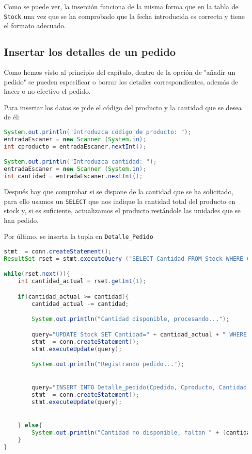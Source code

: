 Como se puede ver, la inserción funciona de la misma forma que en la tabla de \texttt{Stock} una vez que se ha comprobado que la fecha introducida es correcta y tiene el formato adecuado.

\pagebreak
\subsection{Insertar los detalles de un pedido}
Como hemos visto al principio del capítulo, dentro de la opción de "añadir un pedido" se pueden especificar o borrar los detalles correspondientes, además de hacer o no efectivo el pedido.

Para insertar los datos se pide el código del producto y la cantidad que se desea de él:

\begin{lstlisting}[language=Java]
System.out.println("Introduzca código de producto: ");
entradaEscaner = new Scanner (System.in);
int cproducto = entradaEscaner.nextInt();

System.out.println("Introduzca cantidad: ");
entradaEscaner = new Scanner (System.in);
int cantidad = entradaEscaner.nextInt();

\end{lstlisting}

Después hay que comprobar si se dispone de la cantidad que se ha solicitado, para ello usamos un \texttt{SELECT} que nos indique la cantidad total del producto en stock y, si es suficiente, actualizamos el producto restándole las unidades que se han pedido.

Por último, se inserta la tupla en \texttt{Detalle\_Pedido}

\begin{lstlisting}[language=Java]
stmt  = conn.createStatement();
ResultSet rset = stmt.executeQuery ("SELECT Cantidad FROM Stock WHERE Cproducto='" + cproducto + "'");

while(rset.next()){
	int cantidad_actual = rset.getInt(1);

	if(cantidad_actual >= cantidad){
		cantidad_actual -= cantidad;

		System.out.println("Cantidad disponible, procesando...");

		query="UPDATE Stock SET Cantidad=" + cantidad_actual + " WHERE Cproducto='" + cproducto + "'";
		stmt  = conn.createStatement();
		stmt.executeUpdate(query);

		System.out.println("Registrando pedido...");


		query="INSERT INTO Detalle_pedido(Cpedido, Cproducto, Cantidad) VALUES ((SELECT CPedido FROM Pedido WHERE Cpedido='" + cpedido + "'), (SELECT Cproducto FROM Stock WHERE Cproducto='" + cproducto + "')," + cantidad + ")";
		stmt  = conn.createStatement();
		stmt.executeUpdate(query);


	} else{
		System.out.println("Cantidad no disponible, faltan " + (cantidad-cantidad_actual) + " unidades");
	}
}
\end{lstlisting}

